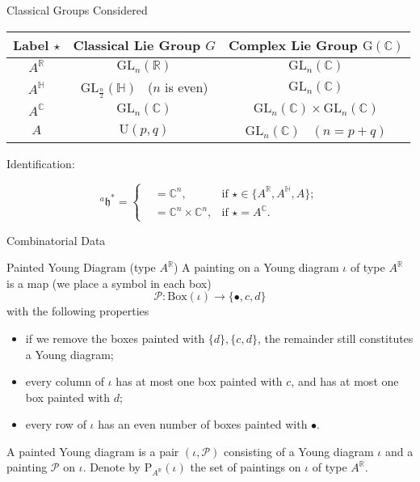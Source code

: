 \documentclass[fleqn,xcolor=dvipsnames]{beamer}
\newcommand{\BC}{{\mathbb {C}}}
\newcommand{\BH}{{\mathbb {H}}}
\newcommand{\BR}{{\mathbb {R}}}
\newcommand{\CP}{{\mathcal {P}}}
\newcommand{\RG}{{\mathrm {G}}}
\newcommand{\fh}{\mathfrak{h}}
\newcommand{\GL}{{\mathrm{GL}}}
\newcommand{\U}{{\mathrm{U}}}
\begin{document}
\begin{frame}{Classical Groups Considered}

\begin{center}
   \begin{tabular}{c|c|c}
      \toprule
      Label $\star $ & Classical Lie Group $G$ & Complex Lie Group $\RG(\BC)$    \\
      \midrule
      $A^{\BR}$      & $\GL_n(\BR)$          & $\GL_n(\BC)$                   \\
      $A^{\BH}$      & $\GL_{\frac{n}{2}}(\BH)$ \  ($n$ is even)      & $\GL_n(\BC)$                   \\
      $A^{\BC}$      & $\GL_n(\BC)$          & $\GL_n(\BC) \times \GL_n(\BC)$ \\
      $A$            & $\U(p,q)$              & $\GL_n(\BC)$ \ $(n = p + q)$                   \\
      \bottomrule
   \end{tabular}
\end{center}

Identification:

\[{^{a}\fh}^* = \left\{
   \begin{aligned}
       &= \BC^n, & \textrm{if $\star \in \{A^\BR,A^\BH,A\}$};\\
       &= \BC^n \times \BC^n, & \textrm{if $\star = A^\BC$}.
   \end{aligned}
   \right.
\]
\end{frame}






\begin{frame}{Combinatorial Data}
  \begin{block}{Painted Young Diagram (type $A^{\BR}$)}
    A painting on a Young diagram $\iota$ of type $A^{\BR}$ is a map (we place a symbol in each box)
   $$\CP : \mathrm{Box}(\iota) \to \{ \bullet, c ,d \}$$
   with the following properties

   \begin{itemize}
      \item if we remove the boxes painted with $\{d\}, \{c,d\}$, the remainder still constitutes a Young diagram;
      \item every column of $\iota$ has at most one box painted with $c$, and has at most one box painted with $d$;
      \item every row of $\iota$ has an even number of boxes painted with $\bullet$.
   \end{itemize}
   A painted Young diagram is a pair $(\iota, \CP)$ consisting of a Young diagram $\iota$ and a painting $\CP$ on $\iota$. Denote by $\mathrm{P}_{A^{\BR}}(\iota)$ the set of paintings on $\iota$ of type $A^{\BR}$.
  \end{block}
  
\end{frame}
\end{document}
